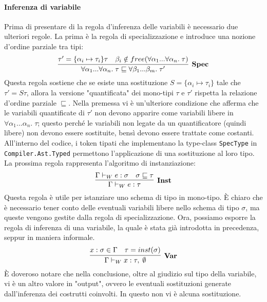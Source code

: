 \documentclass[10pt,a4paper]{article}
\begin{document}
\paragraph{Inferenza di variabile}
Prima di presentare di la regola d'inferenza delle variabili è necessario due ulteriori regole. La prima è la
regola di specializzazione e introduce una nozione d'ordine parziale tra tipi:
\[ \infer[\textbf{Spec}]{\forall \alpha_1 ... \forall \alpha_n. \; \tau \sqsubseteq \forall \beta_1 ... \beta_m. \; \tau'}{\tau' = \{ \alpha_i \mapsto \tau_i \}\tau & \beta_i \notin free(\forall \alpha_1 ... \forall \alpha_n . \; \tau)} \]
Questa regola sostiene che se esiste una sostituzione $ S = \{ \alpha_i \mapsto \tau_i \} $ tale che $ \tau' = S \tau $,
allora la versione "quantificata" dei mono-tipi $ \tau $ e $ \tau' $ rispetta la relazione d'ordine parziale
$ \sqsubseteq $. Nella premessa vi è un'ulteriore condizione che afferma che le variabili quantificate di $ \tau' $
non devono apparire come variabili libere in $ \forall \alpha_1 ... \alpha_n. \; \tau $; questo perché le variabili
non legate da un quantificatore (quindi libere) non devono essere sostituite, bensì devono essere trattate come costanti.
All'interno del codice, i token tipati che implementano la type-class \texttt{SpecType} in \texttt{Compiler.Ast.Typed}
permettono l'applicazione di una sostituzione al loro tipo.
La prossima regola rappresenta l'algoritmo di instanziazione:
\[ \infer[\textbf{Inst}]{\Gamma \vdash_W e : \tau}{\Gamma \vdash_W e : \sigma & \sigma \sqsubseteq \tau} \]
Questa regola è utile per istanziare uno schema di tipo in mono-tipo. \`E chiaro che è necessario tener conto delle
eventuali variabili libere nello schema di tipo $ \sigma $, ma queste vengono gestite dalla regola di specializzazione.
Ora, possiamo esporre la regola di inferenza di una variabile, la quale è stata già introdotta in precedenza, seppur
in maniera informale.
\[ \infer[\textbf{Var}]{\Gamma \vdash_W x : \tau, \; \emptyset}{x : \sigma \in \Gamma & \tau = inst(\sigma)} \]
\`E doveroso notare che nella conclusione, oltre al giudizio sul tipo della variabile, vi è un altro valore in "output",
ovvero le eventuali sostituzioni generate dall'inferenza dei costrutti coinvolti. In questo non vi è alcuna sostituzione.
\end{document}
